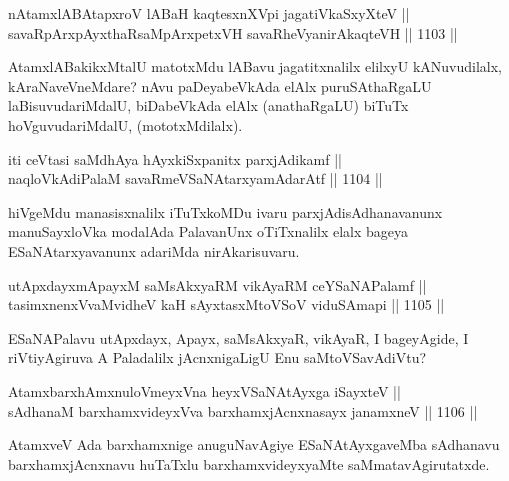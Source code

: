 
\begin{shl}
nA\s \s tamxlABAtapxroV lABaH kaqtesxnXV\s pi jagatiVkaSxyXteV || \\
savaRpArxpAyxthaRsaMpArxpetxVH savaRheVyanirAkaqteVH \hfill || 1103 ||  
\end{shl}

\begin{artha}
AtamxlABakikxMtalU matotxMdu lABavu jagatitxnalilx elilxyU kANuvudilalx, kAraNaveVneMdare? nAvu paDeyabeVkAda elAlx puruSAthaRgaLU laBisuvudariMdalU, biDabeVkAda elAlx (anathaRgaLU) biTuTx hoVguvudariMdalU, (mototxMdilalx).
\end{artha}

\begin{shl}
iti ceVtasi saMdhAya hAyxkiSxpanitx parxjAdikamf || \\
naqloVkAdiPalaM savaRmeVSaNAtarxyamAdarAtf \hfill || 1104 ||  
\end{shl}

\begin{artha}
hiVgeMdu manasisxnalilx iTuTxkoMDu ivaru parxjAdisAdhanavanunx manuSayxloVka modalAda PalavanUnx oTiTxnalilx elalx bageya ESaNAtarxyavanunx adariMda nirAkarisuvaru.
\end{artha}


\begin{shl}
utApxdayxmApayxM saMsAkxyaRM vikAyaRM ceYSaNAPalamf || \\
tasimxnenxVvaMvidheV kaH sAyxtasxMtoVSoV viduSAmapi \hfill || 1105 ||  
\end{shl}

\begin{artha}
ESaNAPalavu utApxdayx, Apayx, saMsAkxyaR, vikAyaR, I bageyAgide, I riVtiyAgiruva A Paladalilx jAcnxnigaLigU Enu saMtoVSavAdiVtu?
\end{artha}


\begin{shl}
AtamxbarxhAmxnuloVmeyxVna heyxVSaNAtAyxga iSayxteV || \\
sAdhanaM barxhamxvideyxVva barxhamxjAcnxnasayx janamxneV \hfill || 1106 ||  
\end{shl}

\begin{artha}
AtamxveV Ada barxhamxnige anuguNavAgiye ESaNAtAyxgaveMba sAdhanavu barxhamxjAcnxnavu huTaTxlu barxhamxvideyxyaMte saMmatavAgirutatxde.
\end{artha}

